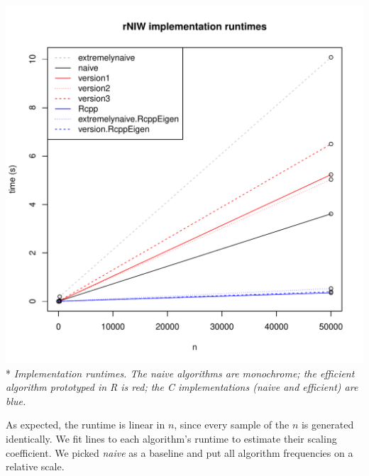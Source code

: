 \documentclass[english]{report}
\begin{document}
\begin{center}
\includegraphics[scale=.5]{runtimes.pdf}\\*
\emph{Implementation runtimes. The naive algorithms are monochrome; the efficient algorithm prototyped in R is red; the C implementations (naive and efficient) are blue.}
\end{center}

As expected, the runtime is linear in $n$, since every sample of the $n$ is generated identically. We fit lines to each algorithm's runtime to estimate their scaling coefficient. We picked \emph{naive} as a baseline and put all algorithm frequencies on a relative scale.
\end{document}
